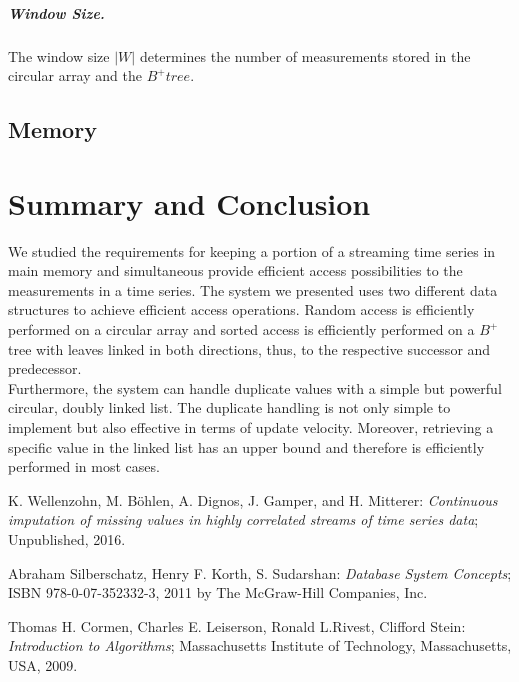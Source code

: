 \documentclass[abstracton,12pt]{scrreprt}
\begin{document}

\paragraph{Window Size.}
The window size $|W|$ determines the number of measurements stored in the circular array and the $B^+tree$. 

\section{Memory}

\chapter{Summary and Conclusion}
\label{sec:Summary}
We studied the requirements for keeping a portion of a streaming time series in main memory and simultaneous provide efficient access possibilities to the measurements in a time series. The system we presented uses two different data structures to achieve efficient access operations. Random access is efficiently performed on a circular array and sorted access is efficiently performed on a $B^+$tree with leaves linked in both directions, thus, to the respective successor and predecessor. \\Furthermore, the system can handle duplicate values with a simple but powerful circular, doubly linked list. The duplicate handling is not only simple to implement but also effective in terms of update velocity. Moreover, retrieving a specific value in the linked list has an upper bound and therefore is efficiently performed in most cases. 



\begin{thebibliography}{99}
	
	
	 K. Wellenzohn, M. Böhlen, A. Dignos, J. Gamper, and H. Mitterer: \emph{Continuous imputation of missing values in highly correlated streams of time series data}; Unpublished, 2016.
	
	 Abraham Silberschatz, Henry F. Korth, S. Sudarshan: \emph{Database System Concepts}; ISBN 978-0-07-352332-3, 2011 by The McGraw-Hill Companies, Inc.

	 Thomas H. Cormen, Charles E. Leiserson, Ronald L.Rivest, Clifford Stein: \emph{Introduction to Algorithms}; Massachusetts Institute of Technology, Massachusetts, USA, 2009. 


\end{thebibliography}
\end{document}
